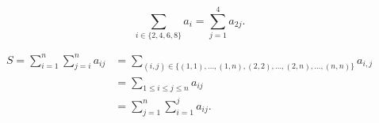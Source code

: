 \begin{exm}
	\[
		\sum_{i \in \{2,4,6,8\}} a_i = \sum_{j=1}^4 a_{2j}.
	\]
\end{exm}

\begin{exm}
	\begin{align*}
		S = \sum_{i=1}^n \sum_{j=i}^n a_{ij} &= \sum_{(i,j) \in \big\{ (1,1),\ldots, (1,n),(2,2),\ldots,(2,n),\ldots,(n,n) \big\}} a_{i,j} \\
		&= \sum_{1\le i\le j\le n} a_{ij} \\
		&= \sum_{j=1}^n \sum_{i=1}^j a_{ij}. \\
	\end{align*}
\end{exm}




